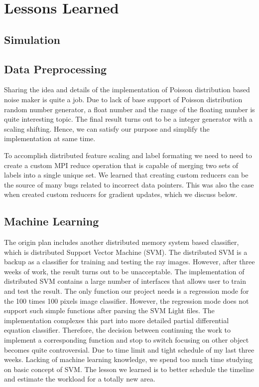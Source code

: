 \section{Lessons Learned}
\label{lessons}

\subsection{Simulation}


\subsection{Data Preprocessing}

Sharing the idea and details of the implementation of Poisson distribution based noise maker is quite a job. Due to lack of base support of Poisson distribution random number generator, a float number and the range of the floating number is quite interesting topic. The final result turns out to be a integer generator with a scaling shifting. Hence, we can satisfy our purpose and simplify the implementation at same time.

To accomplish distributed feature scaling and label formating we need to need to create a custom MPI reduce operation that is capable of merging two sets of labels into a single unique set.  We learned that creating custom reducers can be the source of many bugs related to incorrect data pointers.  This was also the case when created custom reducers for gradient updates, which we discuss below.

\subsection{Machine Learning}

The origin plan includes another distributed memory system based classifier, which is distributed Support Vector Machine (SVM). The distributed SVM is a backup as a classifier for training and testing the ray images. However, after three weeks of work, the result turns out to be unacceptable. The implementation of distributed SVM contains a large number of interfaces that allows user to train and test the result. The only function our project needs is a regression mode for the 100 times 100 pixels image classifier. However, the regression mode does not support such simple functions after parsing the SVM Light files. The implementation complexes this part into more detailed partial differential equation classifier. Therefore, the decision between continuing the work to implement a corresponding function and stop to switch focusing on other object becomes quite controversial. Due to time limit and tight schedule of my last three weeks. Lacking of machine learning knowledge, we spend too much time studying on basic concept of SVM. The lesson we learned is to better schedule the timeline and estimate the workload for a totally new area.

